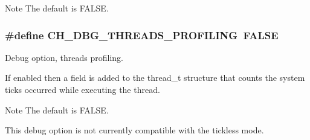\begin{DoxyNote}{Note}
The default is {\ttfamily F\+A\+L\+S\+E}. 
\end{DoxyNote}
\hypertarget{group__config_gadc9c00c2e5b6e766ded8dfa77c0c90c1}{
\subsubsection[{C\+H\+\_\+\+D\+B\+G\+\_\+\+T\+H\+R\+E\+A\+D\+S\+\_\+\+P\+R\+O\+F\+I\+L\+I\+N\+G}]{\setlength{\rightskip}{0pt plus 5cm}\#define C\+H\+\_\+\+D\+B\+G\+\_\+\+T\+H\+R\+E\+A\+D\+S\+\_\+\+P\+R\+O\+F\+I\+L\+I\+N\+G~F\+A\+L\+S\+E}}\label{group__config_gadc9c00c2e5b6e766ded8dfa77c0c90c1}


Debug option, threads profiling. 

If enabled then a field is added to the {\ttfamily thread\+\_\+t} structure that counts the system ticks occurred while executing the thread.

\begin{DoxyNote}{Note}
The default is {\ttfamily F\+A\+L\+S\+E}. 

This debug option is not currently compatible with the tickless mode. 
\end{DoxyNote}
